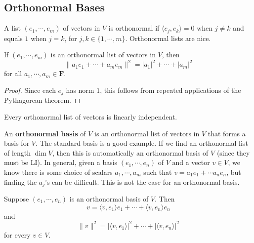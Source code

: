 \subsection{Orthonormal Bases}
A list $(e_1,\cdots ,e_m)$ of vectors in $V$ is orthonormal if $\langle e_j ,e_k \rangle =0$ when $j\neq k$ and equals $1$ when $j=k$, for $j,k\in \{1,\cdots ,m\} $. Orthonormal lists are nice.
\begin{prop}
    If $(e_1,\cdots ,e_m)$ is an orthonormal list of vectors in $V$, then \[
        \|a_1e_1+\cdots +a_me_m\|^2=|a_1|^2+\cdots +|a_m|^2
    \] for all $a_1,\cdots ,a_m\in \mathbf F$.
\end{prop}
\begin{proof}
    Since each $e_j $ has norm $1$, this follows from repeated applications of the Pythagorean theorem.
\end{proof}
\begin{cor}
    Every orthonormal list of vectors is linearly independent.
\end{cor}
An \textbf{orthonormal basis} of $V$ is an orthonormal list of vectors in $V$ that forms a basis for $V$. The standard basis is a good example. If we find an orthonormal list of length $\dim V $, then this is automatically an orthonormal basis of $V$ (since they must be LI). In general, given a basis $(e_1,\cdots ,e_n )$ of $V$ and a vector $v\in V$, we know there is some choice of scalars $a_1,\cdots ,a_m$ such that $v=a_1e_1+\cdots a_n e_n $, but finding the $a_j $'s can be difficult. This is not the case for an orthonormal basis.
\begin{theorem}
    Suppose $(e_1,\cdots ,e_n )$ is an orthonormal basis of $V$. Then \[
    v=\langle v,e_1 \rangle e_1+\cdots +\langle v,e_n  \rangle e_n 
    \] and \[
    \|v\|^2=| \langle v,e_1 \rangle |^2+\cdots +|\langle v,e_n  \rangle |^2
    \] for every $v\in V$.
\end{theorem}
